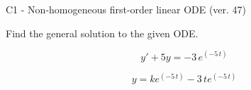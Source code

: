 \begin{exercise}
  \begin{exerciseTitle}C1 - Non-homogeneous first-order linear ODE (ver. 47)\end{exerciseTitle}
  \begin{exerciseStatement}
    
Find the general solution to the given ODE.

    
\[y'+5y= -3 \, e^{\left(-5 \, t\right)}\]

  \end{exerciseStatement}
  \begin{exerciseAnswer}
    
\[y= k e^{\left(-5 \, t\right)} - 3 \, t e^{\left(-5 \, t\right)}\]

  \end{exerciseAnswer}
\end{exercise}